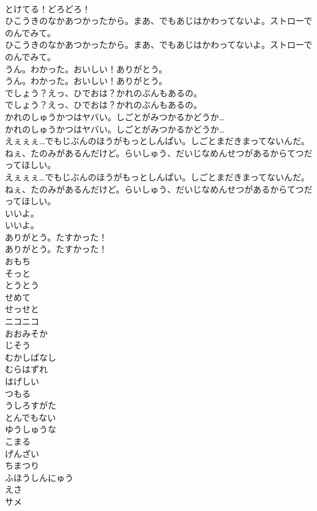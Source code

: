 \documentclass[8pt]{extreport}
\begin{document}
\begin{CJK}{UTF8}{min}
\\	とけてる！どろどろ！ 
\\	ひこうきのなかあつかったから。まあ、でもあじはかわってないよ。ストローでのんでみて。	
\\	ひこうきのなかあつかったから。まあ、でもあじはかわってないよ。ストローでのんでみて。 
\\	うん。わかった。おいしい！ありがとう。	
\\	うん。わかった。おいしい！ありがとう。 
\\	でしょう？えっ、ひでおは？かれのぶんもあるの。	
\\	でしょう？えっ、ひでおは？かれのぶんもあるの。 
\\	かれのしゅうかつはヤバい。しごとがみつかるかどうか…	
\\	かれのしゅうかつはヤバい。しごとがみつかるかどうか… 
\\	えぇぇぇ…でもじぶんのほうがもっとしんぱい。しごとまだきまってないんだ。ねぇ、たのみがあるんだけど。らいしゅう、だいじなめんせつがあるからてつだってほしい。	
\\	えぇぇぇ…でもじぶんのほうがもっとしんぱい。しごとまだきまってないんだ。ねぇ、たのみがあるんだけど。らいしゅう、だいじなめんせつがあるからてつだってほしい。 
\\	いいよ。	
\\	いいよ。 
\\	ありがとう。たすかった！	
\\	ありがとう。たすかった！ 
\\	おもち
\\	そっと
\\	とうとう
\\	せめて
\\	せっせと
\\	ニコニコ
\\	おおみそか
\\	じそう
\\	むかしばなし
\\	むらはずれ
\\	はげしい
\\	つもる
\\	うしろすがた
\\	とんでもない
\\	ゆうしゅうな
\\	こまる
\\	げんざい
\\	ちまつり
\\	ふほうしんにゅう
\\	えさ
\\	サメ

\end{CJK}
\end{document}
